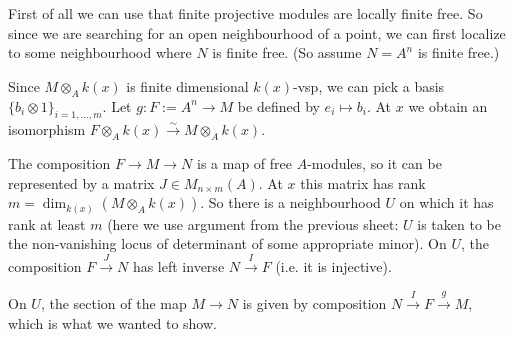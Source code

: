 \newcommand{\sheet}{4}




\maketitle{}

\begin{exercise}{1}
    First of all we can use that finite projective modules are locally finite
    free. So since we are searching for an open neighbourhood of a point,
    we can first localize to some neighbourhood where $N$ is finite free. (So
    assume $N = A^n$ is finite free.)

    Since $M \otimes_A k(x)$ is finite dimensional $k(x)$-vsp, we can pick a
    basis $\{b_i \otimes 1\}_{i = 1, \dots, m}$. Let $g \colon F := A^n \to M$ be defined
    by $e_i \mapsto b_i$. At $x$ we obtain an isomorphism $F \otimes_A k(x)
    \xrightarrow{\sim} M \otimes_A k(x)$.

    The composition $F \to M \to N$ is a map of free $A$-modules, so it can be
    represented by a matrix $J \in M_{n \times m}(A)$.
    At $x$ this matrix has rank $m = \dim_{k(x)} (M \otimes_A k(x))$. So there
    is a neighbourhood $U$ on which it has rank at least $m$ (here we use
    argument from the previous sheet: $U$ is taken to be the non-vanishing locus
    of determinant of some appropriate minor). On $U$, the composition $F
    \xrightarrow{J} N$ has left inverse $N \xrightarrow{I} F$ (i.e. it is
    injective).
    
    On $U$, the section of the map $M \to N$ is given by composition $N
    \xrightarrow{I} F \xrightarrow{g} M$, which is what we wanted to show.
\end{exercise}

